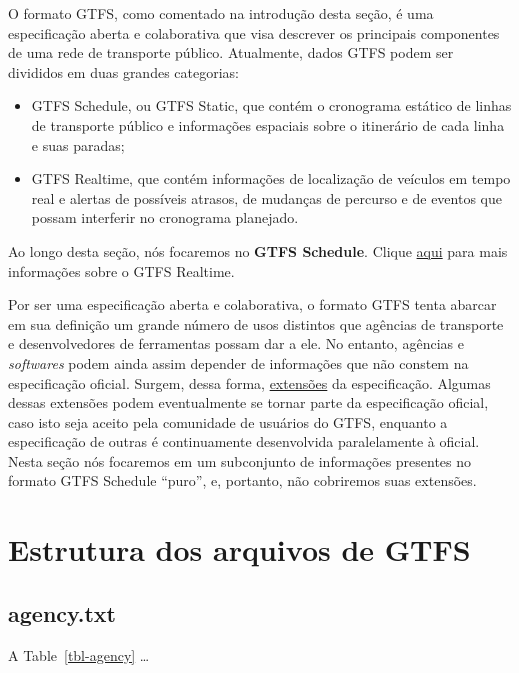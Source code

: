 \documentclass[
  letterpaper,
  DIV=11,
  numbers=noendperiod]{scrreprt}
\providecommand{\tightlist}{%
  \setlength{\itemsep}{0pt}\setlength{\parskip}{0pt}}\usepackage{longtable,booktabs,array}
\begin{document}
O formato GTFS, como comentado na introdução desta seção, é uma
especificação aberta e colaborativa que visa descrever os principais
componentes de uma rede de transporte público. Atualmente, dados GTFS
podem ser divididos em duas grandes categorias:

\begin{itemize}
\tightlist
\item
  GTFS Schedule, ou GTFS Static, que contém o cronograma estático de
  linhas de transporte público e informações espaciais sobre o
  itinerário de cada linha e suas paradas;
\item
  GTFS Realtime, que contém informações de localização de veículos em
  tempo real e alertas de possíveis atrasos, de mudanças de percurso e
  de eventos que possam interferir no cronograma planejado.
\end{itemize}

Ao longo desta seção, nós focaremos no \textbf{GTFS Schedule}. Clique
\href{https://gtfs.org/realtime/}{aqui} para mais informações sobre o
GTFS Realtime.

Por ser uma especificação aberta e colaborativa, o formato GTFS tenta
abarcar em sua definição um grande número de usos distintos que agências
de transporte e desenvolvedores de ferramentas possam dar a ele. No
entanto, agências e \emph{softwares} podem ainda assim depender de
informações que não constem na especificação oficial. Surgem, dessa
forma, \href{https://gtfs.org/extensions/}{extensões} da especificação.
Algumas dessas extensões podem eventualmente se tornar parte da
especificação oficial, caso isto seja aceito pela comunidade de usuários
do GTFS, enquanto a especificação de outras é continuamente desenvolvida
paralelamente à oficial. Nesta seção nós focaremos em um subconjunto de
informações presentes no formato GTFS Schedule ``puro'', e, portanto,
não cobriremos suas extensões.

\hypertarget{estrutura-dos-arquivos-de-gtfs}{%
\section{Estrutura dos arquivos de
GTFS}\label{estrutura-dos-arquivos-de-gtfs}}

\hypertarget{agency.txt}{%
\subsection{agency.txt}\label{agency.txt}}

A Table~\ref{tbl-agency} \ldots{}
\end{document}
